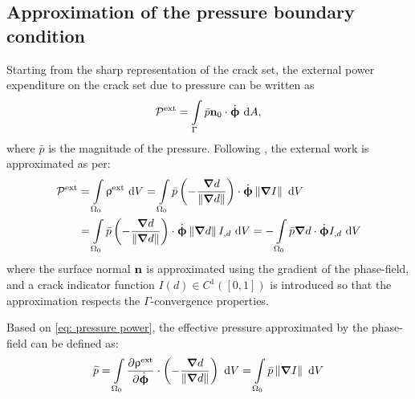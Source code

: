 \subsection{Approximation of the pressure boundary condition}

Starting from the sharp representation of the crack set, the external power expenditure on the crack set due to pressure can be written as
\begin{align}
  \mathcal{P}^\text{ext} = \int\limits_{\Gamma} \bar{p}\textbf{n}_0\cdot\dot{\boldsymbol{\upphi}} \text{ d}A,
\end{align}
where $\bar{p}$ is the magnitude of the pressure. Following \cite{CHUKWUDOZIE2019957}, the external work is approximated as per:
\begin{equation}
  \begin{aligned}
    \mathcal{P}^\text{ext} & = \int\limits_{\Omega_0} \uprho^\text{ext} \text{ d}V = \int\limits_{\Omega_0} \bar{p} \left( -\dfrac{\boldsymbol{\nabla} d}{\left\lVert\boldsymbol{\nabla} d\right\rVert} \right) \cdot \dot{\boldsymbol{\upphi}} \left\lVert\boldsymbol{\nabla} I\right\rVert \text{ d}V \\
                           & = \int\limits_{\Omega_0} \bar{p} \left( -\dfrac{\boldsymbol{\nabla} d}{\left\lVert\boldsymbol{\nabla} d\right\rVert} \right) \cdot \dot{\boldsymbol{\upphi}} \left\lVert\boldsymbol{\nabla} d\right\rVert I_{,d} \text{ d}V                                             
    = - \int\limits_{\Omega_0} \bar{p} \boldsymbol{\nabla} d \cdot \dot{\boldsymbol{\upphi}} I_{,d} \text{ d}V
  \end{aligned}
  \label{eq: pressure power}
\end{equation}
where the surface normal $\textbf{n}$ is approximated using the gradient of the phase-field, and a crack indicator function $I(d) \in C^1([0,1])$ is introduced so that the approximation respects the $\Gamma$-convergence properties.

\begin{remark}
  Based on \eqref{eq: pressure power}, the effective pressure approximated by the phase-field can be defined as:
  \begin{align}
    \widetilde{p} = \int\limits_{\Omega_0} \dfrac{\partial \uprho^\text{ext}}{\partial \dot{\boldsymbol{\upphi}}} \cdot \left( -\dfrac{\boldsymbol{\nabla} d}{\left\lVert\boldsymbol{\nabla} d\right\rVert} \right) \text{ d}V = \int\limits_{\Omega_0} \bar{p} \left\lVert\boldsymbol{\nabla} I\right\rVert \text{ d}V
    \label{eq:pressure_approx}
  \end{align}
\end{remark}

